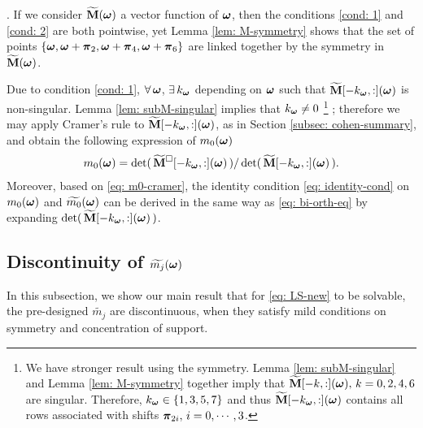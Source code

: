 .
If we consider $\widetilde{\mathbf{M}}(\boldsymbol{\omega})$ a vector function of $\boldsymbol{\omega}$, then the conditions \ref{cond: 1} and \ref{cond: 2} are both pointwise, yet Lemma \ref{lem: M-symmetry} shows that the set of points $\{\boldsymbol{\omega},\boldsymbol{\omega}+\boldsymbol{\pi}_2,\boldsymbol{\omega} + \boldsymbol{\pi}_4, \boldsymbol{\omega}+\boldsymbol{\pi}_6\}$ are linked together by the symmetry in $\widetilde{\mathbf{M}}(\boldsymbol{\omega})$. 

Due to condition \ref{cond: 1}, $\forall\,\boldsymbol{\omega}$, $\exists\, k_{\boldsymbol{\omega}}$ depending on $\boldsymbol{\omega}$ such that $\widetilde{\mathbf{M}}[-k_{\boldsymbol{\omega}},:](\boldsymbol{\omega})$ is non-singular. Lemma \ref{lem: subM-singular} implies that $k_{\boldsymbol{\omega}}\neq 0$ \footnote{We have stronger result using the symmetry. Lemma \ref{lem: subM-singular} and Lemma \ref{lem: M-symmetry} together imply that $\widetilde{\mathbf{M}}[-k,:](\boldsymbol{\omega}),\,k=0,2,4,6$ are singular. Therefore, $k_{\boldsymbol{\omega}} \in\{1,3,5,7\}$ and thus $\widetilde{\mathbf{M}}[-k_{\boldsymbol{\omega}},:](\boldsymbol{\omega})$ contains all rows associated with shifts $\boldsymbol{\pi}_{2i},\, i = 0,\cdots,3$. 
}
; therefore we may apply Cramer's rule to $\widetilde{\mathbf{M}}[-k_{\boldsymbol{\omega}},:](\boldsymbol{\omega})$, as in Section \ref{subsec: cohen-summary}, and obtain
the following expression of $m_0(\boldsymbol{\omega})$
\begin{align}\label{eq: m0-cramer}
m_0(\boldsymbol{\omega}) = \det(\,\widetilde{\mathbf{M}}^{\Box}[-k_{\boldsymbol{\omega}},:](\boldsymbol{\omega})\,)/\det(\,\widetilde{\mathbf{M}}[-k_{\boldsymbol{\omega}},:](\boldsymbol{\omega})\,).
\end{align}
Moreover, based on \eqref{eq: m0-cramer}, the identity condition \eqref{eq: identity-cond} on $m_0(\boldsymbol{\omega})$ and $\widetilde{m_{0}}(\boldsymbol{\omega})$ can be derived in the same way as \eqref{eq: bi-orth-eq} by expanding $\det(\,\widetilde{\mathbf{M}}[-k_{\boldsymbol{\omega}},:](\boldsymbol{\omega})\,)$.


\subsection{Discontinuity of $\widetilde{m_{j}}(\boldsymbol{\omega})$}\label{subsec: discontinuity}
In this subsection, we show our main result that for \eqref{eq: LS-new} to be solvable, the pre-designed $\widetilde{m_j}$ are discontinuous, when they satisfy mild conditions on symmetry and concentration of support.


